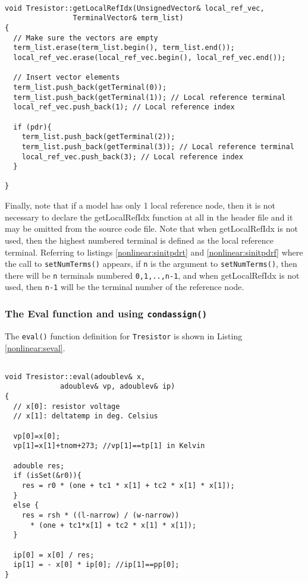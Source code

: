 \begin{lstlisting}[firstnumber=122, label={nonlinear:sglri},
    caption={getLocalRefIdx function of Tresistor.cc}]

void Tresistor::getLocalRefIdx(UnsignedVector& local_ref_vec,
                TerminalVector& term_list)
{
  // Make sure the vectors are empty
  term_list.erase(term_list.begin(), term_list.end());
  local_ref_vec.erase(local_ref_vec.begin(), local_ref_vec.end());

  // Insert vector elements
  term_list.push_back(getTerminal(0));
  term_list.push_back(getTerminal(1)); // Local reference terminal
  local_ref_vec.push_back(1); // Local reference index

  if (pdr){
    term_list.push_back(getTerminal(2));
    term_list.push_back(getTerminal(3)); // Local reference terminal
    local_ref_vec.push_back(3); // Local reference index
  }

}
\end{lstlisting}
Finally, note that if a model has only 1 local reference node, then it is not
necessary to declare the getLocalRefIdx function at all in the header file and
it may be omitted from the source code file.  Note that when getLocalRefIdx is
not used, then the highest numbered terminal is defined as the local reference
terminal.  Referring to listings \ref{nonlinear:sinitpdrt} and \ref{nonlinear:sinitpdrf}
where the call to \texttt{setNumTerms()} appears, if \texttt{n} is the argument to
\texttt{setNumTerms()}, then there will be \texttt{n} terminals numbered \texttt{0,1,..,n-1},
and when getLocalRefIdx is not used, then \texttt{n-1} will be the terminal number
of the reference node.

\subsubsection{The Eval function and using \texttt{condassign()}} \label{nonlinear:eval}

The \texttt{eval()} function definition for \texttt{Tresistor} is
shown in Listing \ref{nonlinear:seval}.

\begin{lstlisting}[firstnumber=100, label={nonlinear:seval},
    caption={Eval function of Tresistor.cc}]

void Tresistor::eval(adoublev& x,
             adoublev& vp, adoublev& ip)
{
  // x[0]: resistor voltage
  // x[1]: deltatemp in deg. Celsius

  vp[0]=x[0];
  vp[1]=x[1]+tnom+273; //vp[1]==tp[1] in Kelvin

  adouble res;
  if (isSet(&r0)){
    res = r0 * (one + tc1 * x[1] + tc2 * x[1] * x[1]);
  }
  else {
    res = rsh * ((l-narrow) / (w-narrow))
      * (one + tc1*x[1] + tc2 * x[1] * x[1]);
  }

  ip[0] = x[0] / res;
  ip[1] = - x[0] * ip[0]; //ip[1]==pp[0];
}
\end{lstlisting}

